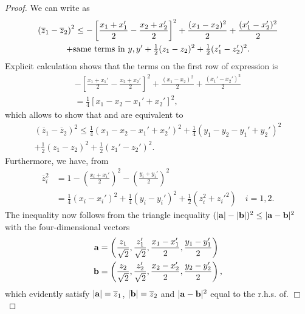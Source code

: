\documentclass[invmat]{svjour}
\begin{document}
\begin{proof}
We can write as
\begin{multline}
\left( \overline{z}_1 - \overline{z}_2 \right)^2
\le -
\left[ \frac{x_1 + x_1'}{2}- \frac{x_2 + x_2'}{2} \right]^2 +
\frac{ (x_1-x_2)^2}{2} + \frac{(x_1'-x_2')^2}{2} \\
 + \text{same terms in $y, y'$}
 + \tfrac{1}{2}(z_1 - z_2)^2 + \tfrac{1}{2} (z_1' - z_2')^2.
\label{e:reworked_inequality_1}
\end{multline}
Explicit calculation shows that the terms on the first row of expression is
\begin{multline*}
-
\left[ \frac{x_1 + x_1'}{2}- \frac{x_2 + x_2'}{2} \right]^2 +
\frac{ (x_1-x_2)^2}{2} + \frac{(x_1'-x_2')^2}{2} \\= \tfrac{1}{4}[x_1 - x_2 - x_1' + x_2']^2,
\end{multline*}
which allows to show that and 
are equivalent to
\begin{multline}
\left( \overline{z}_1 - \overline{z}_2\right)^2
\le
\tfrac{1}{4} \left( x_1 - x_2 - x_1' + x_2' \right)^2 +
\tfrac{1}{4} \left( y_1 - y_2 - y_1' + y_2' \right)^2 \\
+ \tfrac{1}{2} \left( z_1 - z_2\right)^2
+ \tfrac{1}{2}\left( z_1' - z_2'\right)^2.
\label{e:reworked_inequality}
\end{multline}
Furthermore, we have, from 
\begin{align*}
\overline{z}_i^2 &= 1 - \left(\frac{x_i + x_i'}{2} \right)^2 -
\left(\frac{y_i + y_i'}{2} \right)^2\\
      &=
\tfrac{1}{4} (x_i-x_i')^2 +
\tfrac{1}{4} (y_i-y_i')^2 +
\tfrac{1}{2} (z_i^2+z_i'^2)\quad i=1,2.
\end{align*}
The inequality now follows from the
triangle inequality $(|\mathbf{a}| - |\mathbf{b}|)^2 \le | \mathbf{a} -
\mathbf{b}|^2$ with the four-dimensional vectors
\begin{align*}
\mathbf{a}&= \left( \frac{z_1}{\sqrt{2}}, \frac{z_1'}{\sqrt{2}},
\frac{x_1-x_1'}{2}, \frac{y_1-y_1'}{2} \right)\\
\mathbf{b} &= \left( \frac{z_2}{\sqrt{2}}, \frac{z_2'}{\sqrt{2}},
\frac{x_2-x_2'}{2}, \frac{y_2-y_2'}{2} \right),
\end{align*}
which evidently satisfy $|\mathbf{a}|= \overline{z}_1$, $|\mathbf{b}|= \overline{z}_2$
and $| \mathbf{a} - \mathbf{b}|^2$ equal to the r.h.s. of.
$\Box$
\end{proof}
\end{document}
